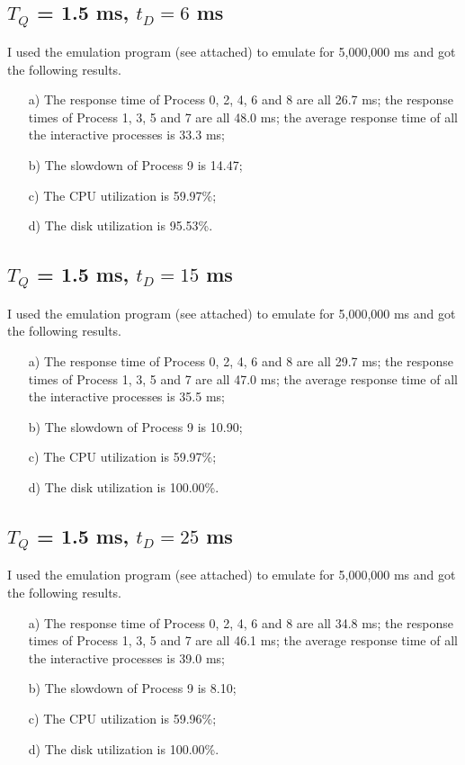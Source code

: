 \documentclass[12pt,letterpaper]{article}
\begin{document}
\subsection{$T_Q$ = 1.5 ms, $t_D=6$ ms}
I used the emulation program (see attached) to emulate for 5,000,000 ms and got the following results.
\begin{enumerate}
\item[a)] The response time of Process 0, 2, 4, 6 and 8 are all 26.7 ms; the response times of Process 1, 3, 5 and 7 are all 48.0 ms; the average response time of all the interactive processes is 33.3 ms;
\item[b)] The slowdown of Process 9 is 14.47;
\item[c)] The CPU utilization is 59.97\%;
\item[d)] The disk utilization is 95.53\%.
\end{enumerate}

\subsection{$T_Q$ = 1.5 ms, $t_D=15$ ms}
I used the emulation program (see attached) to emulate for 5,000,000 ms and got the following results.
\begin{enumerate}
\item[a)] The response time of Process 0, 2, 4, 6 and 8 are all 29.7 ms; the response times of Process 1, 3, 5 and 7 are all 47.0 ms; the average response time of all the interactive processes is 35.5 ms;
\item[b)] The slowdown of Process 9 is 10.90;
\item[c)] The CPU utilization is 59.97\%;
\item[d)] The disk utilization is 100.00\%.
\end{enumerate}

\subsection{$T_Q$ = 1.5 ms, $t_D=25$ ms}
I used the emulation program (see attached) to emulate for 5,000,000 ms and got the following results.
\begin{enumerate}
\item[a)] The response time of Process 0, 2, 4, 6 and 8 are all 34.8 ms; the response times of Process 1, 3, 5 and 7 are all 46.1 ms; the average response time of all the interactive processes is 39.0 ms;
\item[b)] The slowdown of Process 9 is 8.10;
\item[c)] The CPU utilization is 59.96\%;
\item[d)] The disk utilization is 100.00\%.
\end{enumerate}
\end{document}
